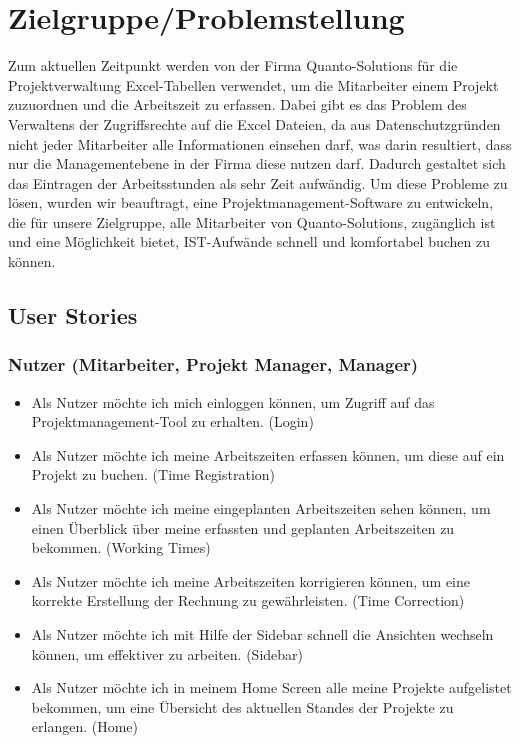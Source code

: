 \documentclass{article}
\begin{document}
\newpage



\section{Zielgruppe/Problemstellung}
Zum aktuellen Zeitpunkt werden von der Firma Quanto-Solutions für die Projektverwaltung Excel-Tabellen verwendet, um die Mitarbeiter einem Projekt zuzuordnen und die Arbeitszeit zu erfassen. Dabei gibt es das Problem des Verwaltens der Zugriffsrechte auf die Excel Dateien, da aus Datenschutzgründen nicht jeder Mitarbeiter alle Informationen einsehen darf, was darin resultiert, dass nur die Managementebene in der Firma diese nutzen darf.  Dadurch gestaltet sich das Eintragen der Arbeitsstunden als sehr Zeit aufwändig.
Um diese Probleme zu lösen, wurden wir beauftragt, eine Projektmanagement-Software zu entwickeln, die für unsere Zielgruppe, alle Mitarbeiter von Quanto-Solutions, zugänglich ist und eine Möglichkeit bietet, IST-Aufwände schnell und komfortabel buchen zu können.

    \subsection{ User Stories}
        \subsubsection{Nutzer (Mitarbeiter, Projekt Manager, Manager) }
         \begin{itemize}
        \item Als Nutzer möchte ich mich einloggen können, um Zugriff auf das Projektmanagement-Tool zu erhalten. (Login)
        \item Als Nutzer möchte ich meine Arbeitszeiten erfassen können, um diese auf ein Projekt zu buchen. (Time Registration)
        \item Als Nutzer möchte ich meine eingeplanten Arbeitszeiten sehen können, um einen Überblick über meine erfassten und geplanten Arbeitszeiten zu bekommen. (Working Times)
        \item Als Nutzer möchte ich meine Arbeitszeiten korrigieren können, um eine korrekte Erstellung der Rechnung zu gewährleisten. (Time Correction)
        \item Als Nutzer möchte ich mit Hilfe der Sidebar schnell die Ansichten wechseln können, um effektiver zu arbeiten. (Sidebar)
        \item Als Nutzer möchte ich in meinem Home Screen alle meine Projekte aufgelistet bekommen, um eine Übersicht des aktuellen Standes der Projekte zu erlangen. (Home)
        \end{itemize}
\end{document}
